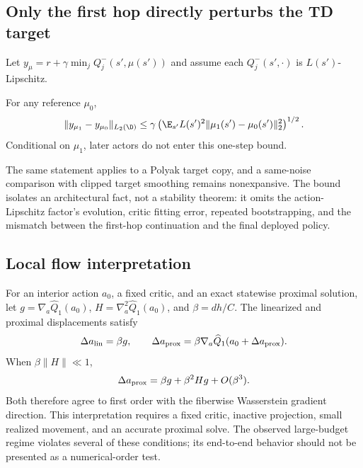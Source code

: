 \subsection{Only the first hop directly perturbs the TD target}

Let $y_{\mu}=r+\gamma\min_jQ_j^-(s',\mu(s'))$ and assume each $Q_j^-(s',\cdot)$ is $L(s')$-Lipschitz.

\begin{proposition}
\label{prop:target_perturbation}
For any reference $\mu_0$,
\begin{equation}
 \|y_{\mu_1}-y_{\mu_0}\|_{L_2(\D)}
 \leq\gamma\left(
 \E_{s'}L(s')^2\|\mu_1(s')-\mu_0(s')\|_2^2
 \right)^{1/2}.                                                \label{eq:target_bound}
\end{equation}
Conditional on $\mu_1$, later actors do not enter this one-step bound.
\end{proposition}

The same statement applies to a Polyak target copy, and a same-noise comparison with clipped target smoothing remains nonexpansive. The bound isolates an architectural fact, not a stability theorem: it omits the action-Lipschitz factor's evolution, critic fitting error, repeated bootstrapping, and the mismatch between the first-hop continuation and the final deployed policy.

\subsection{Local flow interpretation}

For an interior action $a_0$, a fixed critic, and an exact statewise proximal solution, let $g=\nabla_a\widehat Q_1(a_0)$, $H=\nabla_a^2\widehat Q_1(a_0)$, and $\beta=dh/C$. The linearized and proximal displacements satisfy
\begin{equation}
 \Delta a_{\rm lin}=\beta g,
 \qquad
 \Delta a_{\rm prox}=\beta\nabla_a\widehat Q_1(a_0+\Delta a_{\rm prox}). \label{eq:local}
\end{equation}
When $\beta\|H\|\ll1$,
\begin{equation}
 \Delta a_{\rm prox}=\beta g+\beta^2Hg+O(\beta^3).             \label{eq:local_expansion}
\end{equation}
Both therefore agree to first order with the fiberwise Wasserstein gradient direction. This interpretation requires a fixed critic, inactive projection, small realized movement, and an accurate proximal solve. The observed large-budget regime violates several of these conditions; its end-to-end behavior should not be presented as a numerical-order test.

